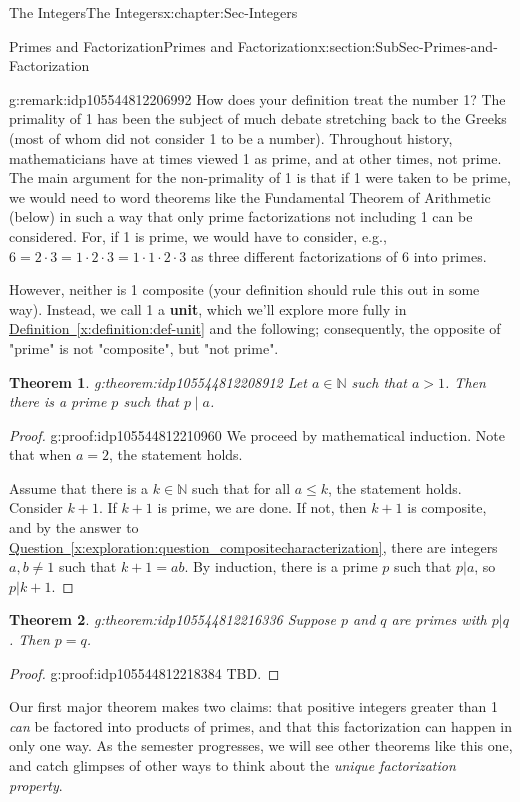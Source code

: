 \documentclass[oneside,10pt,]{book}
\newcommand{\xreffont}{\relax}
\newcommand{\terminology}[1]{\textbf{#1}}
\numberwithin{equation}{section}
\renewcommand{\le}{\leqslant}
\def\N{{\mathbb N}}
\newtheorem{theorem}{Theorem}[section]
\begin{document}
\begin{chapterptx}{The Integers}{}{The Integers}{}{}{x:chapter:Sec-Integers}
\begin{sectionptx}{Primes and Factorization}{}{Primes and Factorization}{}{}{x:section:SubSec-Primes-and-Factorization}
\begin{remark}{}{g:remark:idp105544812206992}
How does your definition treat the number 1? The primality of 1 has been the subject of much debate stretching back to the Greeks (most of whom did not consider 1 to be a number). Throughout history, mathematicians have at times viewed 1 as prime, and at other times, not prime. The main argument for the non-primality of 1 is that if 1 were taken to be prime, we would need to word theorems like the Fundamental Theorem of Arithmetic (below) in such a way that only prime factorizations not including 1 can be considered. For, if 1 is prime, we would have to consider, e.g., \(6 = 2\cdot 3 = 1\cdot 2 \cdot 3 = 1\cdot 1\cdot 2\cdot 3\) as three different factorizations of 6 into primes.%
\par
However, neither is 1 composite (your definition should rule this out in some way). Instead, we call 1 a \terminology{unit}, which we'll explore more fully in \hyperref[x:definition:def-unit]{Definition~{\xreffont\ref{x:definition:def-unit}}} and the following; consequently, the opposite of "prime" is not "composite", but "not prime".%
\end{remark}
\begin{theorem}{}{}{g:theorem:idp105544812208912}%
Let \(a\in \N\) such that \(a > 1\). Then there is a prime \(p\) such that \(p\mid a\).%
\end{theorem}
\begin{proof}{}{g:proof:idp105544812210960}
We proceed by mathematical induction. Note that when \(a = 2\), the statement holds.%
\par
Assume that there is a \(k\in\N\) such that for all \(a\le k\), the statement holds. Consider \(k+1\). If \(k+1\) is prime, we are done. If not, then \(k+1\) is composite, and by the answer to \hyperref[x:exploration:question_compositecharacterization]{Question~{\xreffont\ref{x:exploration:question_compositecharacterization}}}, there are integers \(a,b\ne 1\) such that \(k+1 = ab\). By induction, there is a prime \(p\) such that \(p|a\), so \(p|k+1\).%
\end{proof}
\begin{theorem}{}{}{g:theorem:idp105544812216336}%
Suppose \(p\) and \(q\) are primes with \(p|q\). Then \(p = q\).%
\end{theorem}
\begin{proof}{}{g:proof:idp105544812218384}
TBD.\end{proof}
Our first major theorem makes two claims: that positive integers greater than 1 \emph{can} be factored into products of primes, and that this factorization can happen in only one way. As the semester progresses, we will see other theorems like this one, and catch glimpses of other ways to think about the \emph{unique factorization property}.%

\end{sectionptx}
\end{chapterptx}
\end{document}
